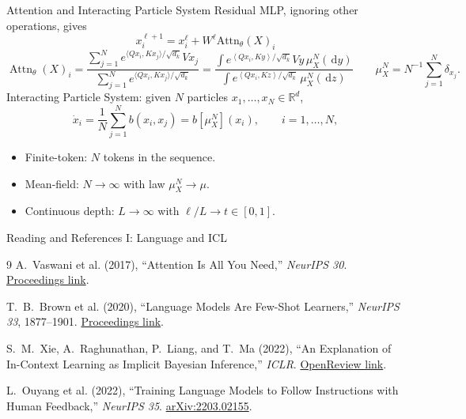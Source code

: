 \documentclass[aspectratio=169,11pt]{beamer}
\newcommand{\R}{\mathbb{R}}
\newcommand{\dd}{\,\mathrm{d}}
\newcommand{\ip}[2]{\left\langle#1,#2\right\rangle}
\begin{document}
\begin{frame}{Attention and Interacting Particle System}
Residual MLP, ignoring other operations, gives
$$x_i^{\ell+1} = x_i^\ell + W^\ell \mathrm{Attn}_\theta(X)_i $$
\[
 \operatorname{Attn}_\theta(X)_i = \frac{
\sum_{j=1}^N e^{\langle Qx_i,Kx_j\rangle/\sqrt{d_k}}Vx_j
 }{ 
\sum_{j=1}^N e^{\langle Qx_i,Kx_j\rangle/\sqrt{d_k}}
 } = 
  \frac{\displaystyle
   \int e^{\ip{Qx_i}{Ky}/\sqrt{d_k}}Vy\,\mu_X^N(\dd y)
 }{\displaystyle
   \int e^{\ip{Qx_i}{Kz}/\sqrt{d_k}}\,\mu_X^N(\dd z)
 }
 \qquad \mu_X^N=N^{-1}\sum_{j=1}^N\delta_{x_j}. 
\] 
Interacting Particle System: given $N$ particles $x_1,\ldots,x_N\in\R^d$,
\[
\dot x_i= \frac1N\sum_{j=1}^N b(x_i,x_j) = b[\mu^N_X](x_i),\qquad i=1,\ldots,N, 
\] 

\begin{itemize}
  \item Finite-token: $N$ tokens in the sequence.
  \item Mean-field: $N\to\infty$ with law $\mu_X^N\to\mu$.
  \item Continuous depth: $L\to\infty$ with $\ell/L\to t\in[0,1]$. 
\end{itemize}
\end{frame}





\begin{frame}{Reading and References I: Language and ICL}
\footnotesize
\begin{thebibliography}{9}
A.~Vaswani et al. (2017),
``Attention Is All You Need,'' \emph{NeurIPS 30}.
\href{https://proceedings.neurips.cc/paper_files/paper/2017/hash/3f5ee243547dee91fbd053c1c4a845aa-Abstract.html}{Proceedings link}.

T.~B.~Brown et al. (2020),
``Language Models Are Few-Shot Learners,'' \emph{NeurIPS 33}, 1877--1901.
\href{https://proceedings.neurips.cc/paper/2020/hash/1457c0d6bfcb4967418bfb8ac142f64a-Abstract.html}{Proceedings link}.

S.~M.~Xie, A.~Raghunathan, P.~Liang, and T.~Ma (2022),
``An Explanation of In-Context Learning as Implicit Bayesian Inference,'' \emph{ICLR}.
\href{https://openreview.net/forum?id=RdJVFCHjUMI}{OpenReview link}.

L.~Ouyang et al. (2022),
``Training Language Models to Follow Instructions with Human Feedback,'' \emph{NeurIPS 35}.
\href{https://arxiv.org/abs/2203.02155}{arXiv:2203.02155}.


\end{thebibliography}
 \end{frame}
\end{document}
